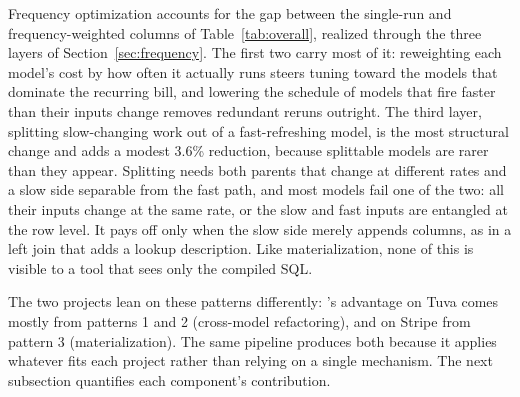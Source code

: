 

Frequency optimization accounts for the gap between the single-run and frequency-weighted columns of Table~\ref{tab:overall}, realized through the three layers of Section~\ref{sec:frequency}. The first two carry most of it: reweighting each model's cost by how often it actually runs steers tuning toward the models that dominate the recurring bill, and lowering the schedule of models that fire faster than their inputs change removes redundant reruns outright. The third layer, splitting slow-changing work out of a fast-refreshing model, is the most structural change and adds a modest 3.6\% reduction, because splittable models are rarer than they appear. Splitting needs both parents that change at different rates and a slow side separable from the fast path, and most models fail one of the two: all their inputs change at the same rate, or the slow and fast inputs are entangled at the row level. It pays off only when the slow side merely appends columns, as in a left join that adds a lookup description. Like materialization, none of this is visible to a tool that sees only the compiled SQL. 


The two projects lean on these patterns differently: \tool{}'s advantage on Tuva comes mostly from patterns 1 and 2 (cross-model refactoring), and on Stripe from pattern 3 (materialization). The same pipeline produces both because it applies whatever fits each project rather than relying on a single mechanism. The next subsection quantifies each component's contribution.






